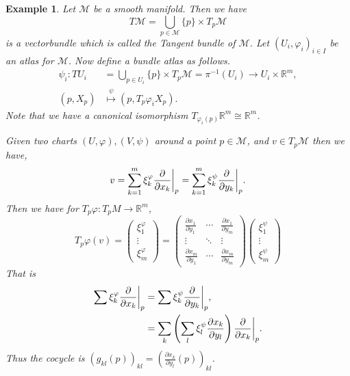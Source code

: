 \documentclass[8pt]{article}
\newtheorem{example}{Example}[section]
\newcommand{\R}[0]{\mathbb{R}}
\newcommand{\M}[0]{\mathcal{M}}
\newcommand{\pd}[2]{{\frac {\partial #1} {\partial #2}}}
\begin{document}
  \begin{example}
    Let $\M$ be a smooth manifold. Then we have 
    \begin{equation*}
      T\M = \bigcup_{p\in\M}\{p\}\times T_p\M
    \end{equation*}
    is a vectorbundle which is called the Tangent bundle of $\M$. Let $(U_i,\varphi_i)_{i\in I}$ be an atlas for $\M$. Now define a bundle atlas as follows.
    \begin{align*}
      \psi_i:TU_i &= \bigcup_{p\in U_i}\{p\}\times T_p\M  = \pi^{-1}(U_i)\to U_i\times \R^m,\\
       (p,X_p)&\stackrel{\psi}{\mapsto} (p,T_p\varphi_iX_p).
    \end{align*}
    Note that we have a canonical isomorphism $T_{\varphi_i(p)}\R^m\cong\R^m$.
    \par Given two charts $(U,\varphi),(V,\psi)$ around a point $p\in \M$, and $v\in T_p\M$ then we have,
    \begin{equation*}
      v = \sum_{k=1}^m \xi_k^\varphi \pd{}{x_k}\bigg{|}_p = \sum_{k=1}^m \xi_k^\psi \pd{}{y_k}\bigg{|}_p.
    \end{equation*}
    Then we have for $T_p\varphi:T_pM\to \R^m$,
    \begin{equation*}
      T_p\varphi(v) = \begin{pmatrix}
        \xi_1^\varphi\\
        \vdots\\
        \xi_m^\varphi
      \end{pmatrix} = 
      \begin{pmatrix}
        \pd{x_1}{y_1} & \cdots & \pd{x_1}{y_m}\\
        \vdots & \ddots & \vdots \\
        \pd{x_m}{y_1}  & \cdots & \pd{x_m}{y_m}
      \end{pmatrix}
      \begin{pmatrix}
        \xi_1^\psi\\
        \vdots\\
        \xi_m^\psi
      \end{pmatrix}
    \end{equation*}
    That is 
    \begin{align*}
      \sum\xi_k^\varphi\pd{}{x_k}\bigg{|}_p & = \sum\xi_k^\psi\pd{}{y_k}\bigg{|}_p,\\
      & = \sum_k\left(\sum_l \xi_l^\psi\pd{x_k}{y_l}\right)\pd{}{x_k}\bigg{|}_p.
    \end{align*}
    Thus the cocycle is $(g_{kl}(p))_{kl} = \left(\pd{x_k}{y_l}(p)\right)_{kl}$.
  \end{example}
\end{document}
